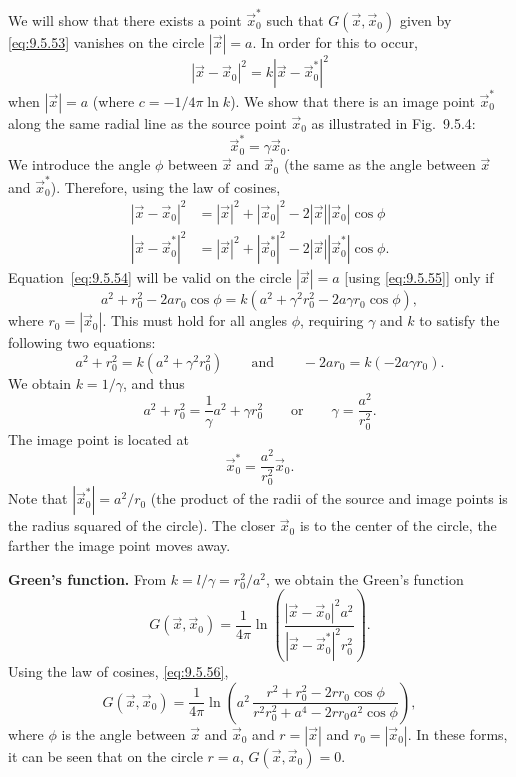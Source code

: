 We will show that there exists a point $\vec{x}_0^*$ such that $G(\vec{x},\vec{x}_0)$ given by \eqref{eq:9.5.53} vanishes on the circle $|\vec{x}| = a$.  In order for this to occur,
\begin{equation}
\label{eq:9.5.54}
|\vec{x}-\vec{x}_0|^2 = k|\vec{x}-\vec{x}_0^*|^2
\end{equation}
when $|\vec{x}| = a$ (where $c = -1/4\pi\ln k$).  We show that there is an image point $\vec{x}_0^*$ along the same radial line as the source point $\vec{x}_0$ as illustrated in Fig.~9.5.4:
\begin{equation}
\label{eq:9.5.55}
\vec{x}_0^* = \gamma\vec{x}_0.
\end{equation}
We introduce the angle $\phi$ between $\vec{x}$ and $\vec{x}_0$ (the same as the angle between $\vec{x}$ and $\vec{x}_0^*$).  Therefore, using the law of cosines,
\begin{equation}
\label{eq:9.5.56}
\begin{aligned}
|\vec{x}-\vec{x}_0|^2 &= |\vec{x}|^2 + |\vec{x}_0|^2 - 2|\vec{x}||\vec{x}_0|\cos\phi \\
|\vec{x}-\vec{x}_0^*|^2 &= |\vec{x}|^2 + |\vec{x}_0^*|^2 - 2|\vec{x}||\vec{x}_0^*|\cos\phi.
\end{aligned}
\end{equation}
Equation~\eqref{eq:9.5.54} will be valid on the circle $|\vec{x}|=a$ [using \eqref{eq:9.5.55}] only if
\[
a^2 + r_0^2 - 2ar_0\cos\phi = k(a^2 + \gamma^2r_0^2 - 2a\gamma r_0\cos\phi),
\]
where $r_0 = |\vec{x}_0|$.  This must hold for all angles $\phi$, requiring $\gamma$ and $k$ to satisfy the following two equations:
\[
a^2 + r_0^2 = k(a^2 + \gamma^2r_0^2) \qquad\text{and}\qquad -2ar_0 = k(-2a\gamma r_0).
\]
We obtain $k = 1/\gamma$, and thus
\[
a^2 + r_0^2 = \frac{1}{\gamma}a^2 + \gamma r_0^2 \qquad\text{or}\qquad \gamma = \frac{a^2}{r_0^2}.
\]
The image point is located at
\[
\vec{x}_0^* = \frac{a^2}{r_0^2}\vec{x}_0.
\]
Note that $|\vec{x}_0^*| = a^2/r_0$ (the product of the radii of the source and image points is the radius squared of the circle).  The closer $\vec{x}_0$ is to the center of the circle, the farther the image point moves away.

\textbf{Green's function.}
From $k = l/\gamma = r_0^2/a^2$, we obtain the Green's function
\[
G(\vec{x},\vec{x}_0) = \frac{1}{4\pi}\ln\left(\frac{|\vec{x}-\vec{x}_0|^2 a^2}{|\vec{x}-\vec{x}_0^*|^2 r_0^2}\right).
\]
Using the law of cosines, \eqref{eq:9.5.56},
\begin{equation}
\label{eq:9.5.57}
\boxed{G(\vec{x},\vec{x}_0) = \frac{1}{4\pi}\ln\left(a^2\,\frac{r^2+r_0^2-2rr_0\cos\phi}{r^2r_0^2+a^4-2rr_0a^2\cos\phi}\right),}
\end{equation}
where $\phi$ is the angle between $\vec{x}$ and $\vec{x}_0$ and $r = |\vec{x}|$ and $r_0 = |\vec{x}_0|$.  In these forms, it can be seen that on the circle $r = a$, $G(\vec{x},\vec{x}_0) = 0$.

